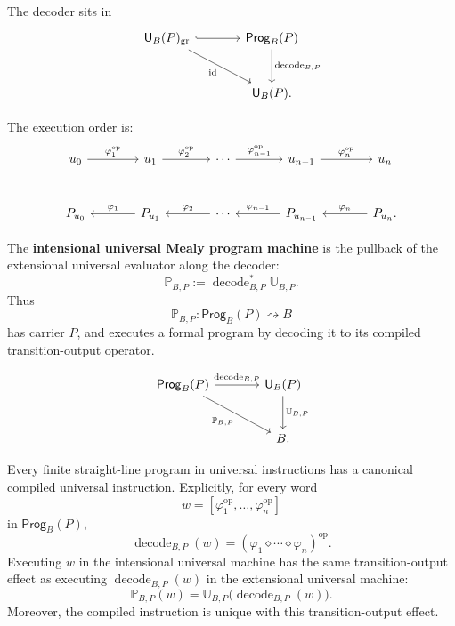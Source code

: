 The decoder sits in
\[
\begin{tikzcd}[column sep=large,row sep=large]
\mathsf U_B(P)_{\mathrm{gr}}
\ar[r,hook]
\ar[dr,swap,"\mathrm{id}"]
&
\mathsf{Prog}_B(P)
\ar[d,"\operatorname{decode}_{B,P}"]
\\
&
\mathsf U_B(P).
\end{tikzcd}
\]

The execution order is:
\[
\begin{tikzcd}[column sep=large,row sep=large]
u_0
\ar[r,"\varphi_1^{\operatorname{op}}"]
&
u_1
\ar[r,"\varphi_2^{\operatorname{op}}"]
&
\cdots
\ar[r,"\varphi_{n-1}^{\operatorname{op}}"]
&
u_{n-1}
\ar[r,"\varphi_n^{\operatorname{op}}"]
&
u_n
\\
P_{u_0}
&
P_{u_1}
\ar[l,swap,"\varphi_1"]
&
\cdots
\ar[l,swap,"\varphi_2"]
&
P_{u_{n-1}}
\ar[l,swap,"\varphi_{n-1}"]
&
P_{u_n}
\ar[l,swap,"\varphi_n"] .
\end{tikzcd}
\]

\begin{definition}
The \textbf{intensional universal Mealy program machine} is the pullback of the extensional
universal evaluator along the decoder:
\[
        \mathbb P_{B,P}
        :=
        \operatorname{decode}_{B,P}^{\ast}\mathbb U_{B,P}.
\]
Thus
\[
        \mathbb P_{B,P}:\mathsf{Prog}_B(P)\rightsquigarrow B
\]
has carrier \(P\), and executes a formal program by decoding it to its compiled transition-output
operator.
\end{definition}

\[
\begin{tikzcd}[column sep=large,row sep=large]
\mathsf{Prog}_B(P)
\ar[r,"\operatorname{decode}_{B,P}"]
\ar[dr,swap,"\mathbb P_{B,P}"]
&
\mathsf U_B(P)
\ar[d,"\mathbb U_{B,P}"]
\\
&
B .
\end{tikzcd}
\]

\begin{theorem}
\label{thm:straight-line-compilation}
Every finite straight-line program in universal instructions has a canonical compiled universal
instruction.  Explicitly, for every word
\[
        w=
        [\varphi_1^{\operatorname{op}},\ldots,\varphi_n^{\operatorname{op}}]
\]
in \(\mathsf{Prog}_B(P)\),
\[
        \operatorname{decode}_{B,P}(w)
        =
        (\varphi_1\diamond\cdots\diamond\varphi_n)^{\operatorname{op}}.
\]
Executing \(w\) in the intensional universal machine has the same transition-output effect as
executing \(\operatorname{decode}_{B,P}(w)\) in the extensional universal machine:
\[
        \mathbb P_{B,P}(w)
        =
        \mathbb U_{B,P}\bigl(\operatorname{decode}_{B,P}(w)\bigr).
\]
Moreover, the compiled instruction is unique with this transition-output effect.
\end{theorem}

